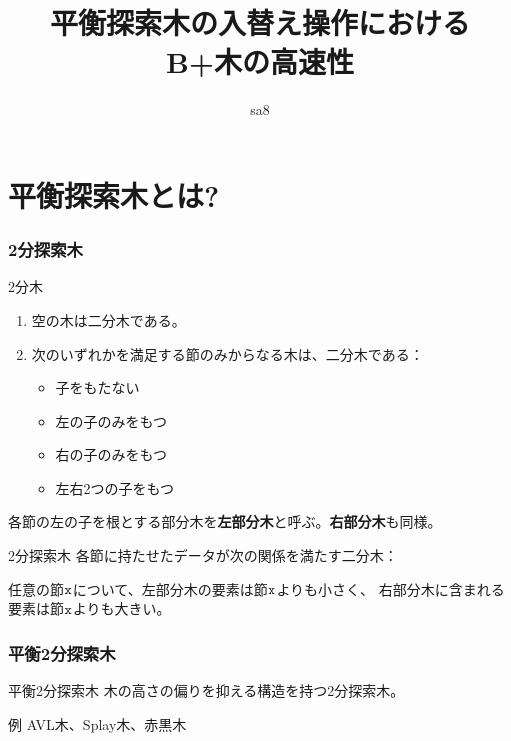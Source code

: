 \documentclass[dvipdfmx,10pt]{beamer}
\title{平衡探索木の入替え操作における\\B+木の高速性}
\author{sa8}
\begin{document}
\maketitle
\section{平衡探索木とは?}
\begin{frame}
    \frametitle{2分探索木}
    \begin{block}{2分木\cite[\S 6.3]{kondo:1998}}
        \begin{enumerate}
            \item 空の木は二分木である。
            \item 次のいずれかを満足する節のみからなる木は、二分木である：
                  \begin{itemize}
                      \item 子をもたない
                      \item 左の子のみをもつ
                      \item 右の子のみをもつ
                      \item 左右2つの子をもつ
                  \end{itemize}
        \end{enumerate}
    \end{block}
    各節の左の子を根とする部分木を{\bf 左部分木}と呼ぶ。{\bf 右部分木}も同様。
    \begin{block}{2分探索木\cite[\S 9]{kondo:1998}}
        各節に持たせたデータが次の関係を満たす二分木：

        任意の節$\tt x$について、左部分木の要素は節$\tt x$よりも小さく、
        右部分木に含まれる要素は節$\tt x$よりも大きい。
    \end{block}
\end{frame}
\begin{frame}
    \frametitle{平衡2分探索木}
    \begin{block}{平衡2分探索木}
        木の高さの偏りを抑える構造を持つ2分探索木。
    \end{block}
    \begin{exampleblock}{例}
        AVL木、Splay木、赤黒木
    \end{exampleblock}

\end{frame}


\end{document}
